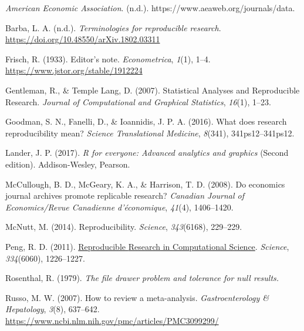 \documentclass[
  a4paper,
]{article}
\newlength{\cslhangindent}
\newenvironment{CSLReferences}[2] %
 {\begin{list}{}{%
  \setlength{\itemindent}{0pt}
  \setlength{\leftmargin}{0pt}
  \setlength{\parsep}{0pt}
  \ifodd #1
   \setlength{\leftmargin}{\cslhangindent}
   \setlength{\itemindent}{-1\cslhangindent}
  \fi
  \setlength{\itemsep}{#2\baselineskip}}}
 {\end{list}}
\begin{document}
\label{refs}
\begin{CSLReferences}{1}{0}
\emph{American {Economic Association}}. (n.d.).
https://www.aeaweb.org/journals/data.

Barba, L. A. (n.d.). \emph{Terminologies for reproducible research}.
\url{https://doi.org/10.48550/arXiv.1802.03311}

Frisch, R. (1933). Editor's note. \emph{Econometrica}, \emph{1}(1),
1--4. \url{https://www.jstor.org/stable/1912224}

Gentleman, R., \& Temple Lang, D. (2007). Statistical {Analyses} and
{Reproducible Research}. \emph{Journal of Computational and Graphical
Statistics}, \emph{16}(1), 1--23.

Goodman, S. N., Fanelli, D., \& Ioannidis, J. P. A. (2016). What does
research reproducibility mean? \emph{Science Translational Medicine},
\emph{8}(341), 341ps12--341ps12.

Lander, J. P. (2017). \emph{R for everyone: Advanced analytics and
graphics} (Second edition). Addison-Wesley, Pearson.

McCullough, B. D., McGeary, K. A., \& Harrison, T. D. (2008). Do
economics journal archives promote replicable research? \emph{Canadian
Journal of Economics/Revue Canadienne d'{é}conomique}, \emph{41}(4),
1406--1420.

McNutt, M. (2014). Reproducibility. \emph{Science}, \emph{343}(6168),
229--229.

Peng, R. D. (2011).
\href{https://www.ncbi.nlm.nih.gov/pubmed/22144613}{Reproducible
{Research} in {Computational Science}}. \emph{Science},
\emph{334}(6060), 1226--1227.

Rosenthal, R. (1979). \emph{The file drawer problem and tolerance for
null results.}

Russo, M. W. (2007). How to review a meta-analysis.
\emph{Gastroenterology \& Hepatology}, \emph{3}(8), 637--642.
\url{https://www.ncbi.nlm.nih.gov/pmc/articles/PMC3099299/}


\end{CSLReferences}
\end{document}
